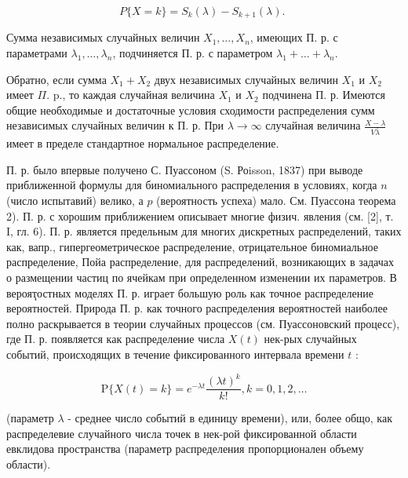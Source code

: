 \documentclass[10pt]{article}
\begin{document}
\[

P\{X=k\}=S_{k}(\lambda)-S_{k+1}(\lambda) \text {. }

\]



Сумма независимых случайных величин $X_{1}, \ldots, X_{n}$, имеющих П. р. с параметрами $\lambda_{1}, \ldots, \lambda_{n}$, подчиняется П. р. с параметром $\lambda_{1}+\ldots+\lambda_{n}$.



Обратно, если сумма $X_{1}+X_{2}$ двух независимых случайных величин $X_{1}$ и $X_{2}$ имеет $\Pi$. p., то каждая случайная величина $X_{1}$ и $X_{2}$ подчинена П. р. Имеются общие необходимые и достаточные условия сходимости распределения сумм независимых случайных величин к П. р. При $\lambda \rightarrow \infty$ случайная величина $\frac{X-\lambda}{V \bar{\lambda}}$ имеет в пределе стандартное нормальное распределение.



П. р. было впервые получено С. Пуассоном (S. Роisson, 1837) при выводе приближенной формулы для биномиального распределения в условиях, когда $n$ (число испытавий) велико, а $p$ (вероятность успеха) мало. См. Пуассона теорема 2). П. р. с хорошим приближением описывает многие физич. явления (см. [2], т. I, гл. 6). П. р. является предельным для многих дискретных распределений, таких как, вапр., гипергеометрическое распределение, отрицательное биномиальное распределение, Пойа распределение, для распределений, возникающих в задачах о размещении частиц по ячейкам при определенном изменении их параметров. В вероятุостных моделях П. р. играет большую роль как точное распределение вероятностей. Природа П. р. как точного распределения вероятностей наиболее полно раскрывается в теории случайных процессов (см. Пуассоновский процесс), где П. р. появляется как распределение числа $X(t)$ нек-рых случайных событий, происходящих в течение фиксированного интервала времени $t$ :



\[

\mathrm{P}\{X(t)=k\}=e^{-\lambda t} \frac{(\lambda t)^{k}}{k !}, k=0,1,2, \ldots

\]



(параметр $\lambda$ - среднее число событий в единицу времени), или, более общо, как распределевие случайного числа точек в нек-рой фиксированной области евклидова пространства (параметр распределения пропорционален объему области).
\end{document}
